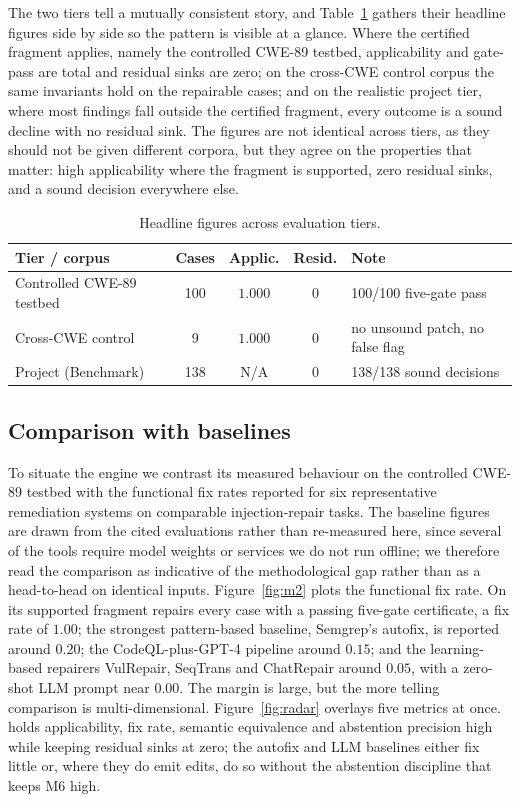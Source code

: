 The two tiers tell a mutually consistent story, and Table~\ref{tab:phases}
gathers their headline figures side by side so the pattern is visible at a
glance. Where the certified fragment applies, namely the controlled CWE-89
testbed, applicability and gate-pass are total and residual sinks are zero;
on the cross-CWE control corpus the same invariants hold on the repairable
cases; and on the realistic project tier, where most findings fall outside
the certified fragment, every outcome is a sound decline with no residual
sink. The figures are not identical across tiers, as they should not be given
different corpora, but they agree on the properties that matter: high
applicability where the fragment is supported, zero residual sinks, and a
sound decision everywhere else.

\begin{table}[ht]
\centering
\caption{Headline figures across evaluation tiers.}
\label{tab:phases}
\begin{tabular}{p{4.6cm}cccp{3.4cm}}
\hline
\textbf{Tier / corpus} & \textbf{Cases} & \textbf{Applic.} & \textbf{Resid.} & \textbf{Note} \\
\hline
Controlled CWE-89 testbed & 100 & $1.000$ & $0$ & 100/100 five-gate pass \\
Cross-CWE control         & 9   & $1.000$ & $0$ & no unsound patch, no false flag \\
Project (Benchmark)       & 138 & N/A     & $0$ & 138/138 sound decisions \\
\hline
\end{tabular}
\end{table}

\subsection{Comparison with baselines}
\label{sec:res-baselines}

To situate the engine we contrast its measured behaviour on the controlled
CWE-89 testbed with the functional fix rates reported for six representative
remediation systems on comparable injection-repair tasks. The baseline
figures are drawn from the cited evaluations rather than re-measured here,
since several of the tools require model weights or services we do not run
offline; we therefore read the comparison as indicative of the methodological
gap rather than as a head-to-head on identical inputs. Figure~\ref{fig:m2}
plots the functional fix rate. On its supported fragment \irsam{} repairs
every case with a passing five-gate certificate, a fix rate of $1.00$; the
strongest pattern-based baseline, Semgrep's autofix, is reported around
$0.20$; the CodeQL-plus-GPT-4 pipeline around $0.15$; and the learning-based
repairers VulRepair, SeqTrans and ChatRepair around $0.05$, with a zero-shot
LLM prompt near $0.00$. The margin is large, but the more telling comparison
is multi-dimensional. Figure~\ref{fig:radar} overlays five metrics at once.
\irsam{} holds applicability, fix rate, semantic equivalence and abstention
precision high while keeping residual sinks at zero; the autofix and LLM
baselines either fix little or, where they do emit edits, do so without the
abstention discipline that keeps M6 high.

